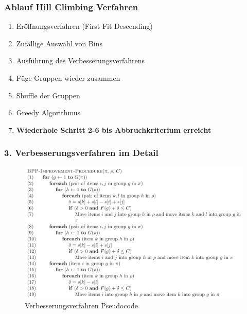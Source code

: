 \documentclass{beamer}
\begin{document}
\begin{frame}
\frametitle{Ablauf Hill Climbing Verfahren}
\begin{footnotesize}
\begin{enumerate}
\item Eröffnungsverfahren (First Fit Descending)
\item Zufällige Auswahl von Bins 
\item Ausführung des Verbesserungsverfahrens
\item Füge Gruppen wieder zusammen
\item Shuffle der Gruppen
\item Greedy Algorithmus
\item \textbf{Wiederhole Schritt 2-6 bis Abbruchkriterium erreicht}
\end{enumerate}
\end{footnotesize}
\end{frame}
\begin{frame}
\frametitle{3. Verbesserungsverfahren im Detail}
\begin{figure}[!htbp]
\begin{center}
\includegraphics[scale=0.25]{img/improvement.png}
\end{center}
\caption{Verbesserungsverfahren Pseudocode}
\label{fig:architecture}
\end{figure}

\end{frame}
\end{document}
